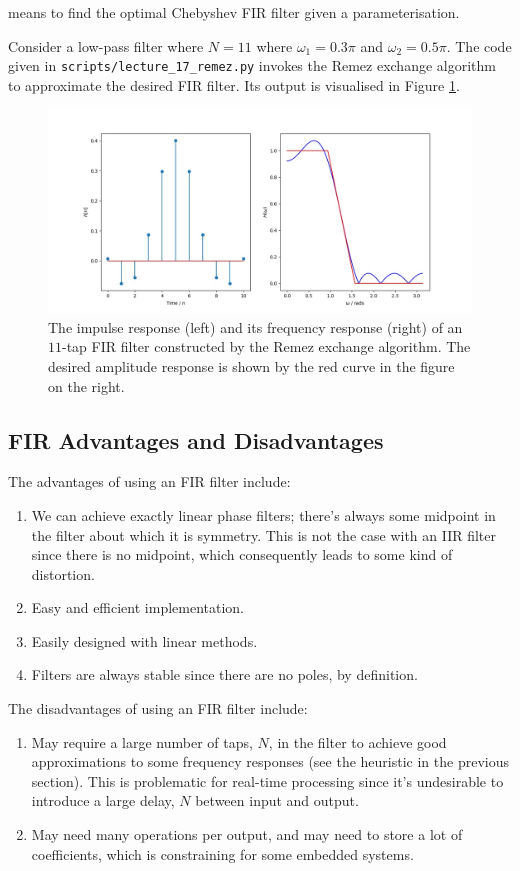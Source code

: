 means to find the optimal Chebyshev FIR filter given a parameterisation.
%
\begin{exmp}
  Consider a low-pass filter where $N=11$ where $\omega_1 = 0.3\pi$ and
  $\omega_2 = 0.5\pi$. The code given in \texttt{scripts/lecture\_17\_remez.py}
  invokes the Remez exchange algorithm to approximate the desired FIR filter.
  Its output is visualised in Figure \ref{fig::lecture_17_remez_example}.
  \begin{figure}[H]
    \includegraphics[width=\textwidth]{images/lecture_17_remez_example.JPG}
    \caption{The impulse response (left) and its frequency response
      (right) of an $11$-tap FIR filter constructed by the Remez exchange
      algorithm. The desired amplitude response is shown by the red
      curve in the figure on the right.
    }
    \label{fig::lecture_17_remez_example}
  \end{figure}
\end{exmp}

\subsection{FIR Advantages and Disadvantages}
%
The advantages of using an FIR filter include:
%
\begin{enumerate}
\item We can achieve exactly linear phase filters; there's always
  some midpoint in the filter about which it is symmetry. This is
  not the case with an IIR filter since there is no midpoint, which
  consequently leads to some kind of distortion.
\item Easy and efficient implementation.
\item Easily designed with linear methods.
\item Filters are always stable since there are no poles, by definition.
\end{enumerate}
%
The disadvantages of using an FIR filter include:
%
\begin{enumerate}
\item May require a large number of taps, $N$, in the filter to achieve good
  approximations to some frequency responses (see the heuristic in
  the previous section). This is problematic for real-time processing since
  it's undesirable to introduce a large delay, $N$ between input and
  output.
\item May need many operations per output, and may need to store
  a lot of coefficients, which is constraining for some embedded systems.
\end{enumerate}
